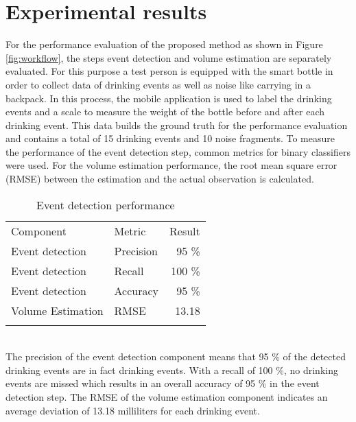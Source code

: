\section{Experimental results}
For the performance evaluation of the proposed method as shown in Figure \ref{fig:workflow}, the steps event detection and volume estimation are separately evaluated. For this purpose a test person is equipped with the smart bottle in order to collect data of drinking events as well as noise like carrying in a backpack. In this process, the mobile application is used to label the drinking events and a scale to measure the weight of the bottle before and after each drinking event. This data builds the ground truth for the performance evaluation and contains a total of 15 drinking events and 10 noise fragments. To measure the performance of the event detection step, common metrics for binary classifiers were used. For the volume estimation performance, the root mean square error (RMSE) between the estimation and the actual observation is calculated.
\begin{table}[h]
    \centering
    \caption{Event detection performance}
    \begin{tabular}{llr}
        \hline\noalign{\smallskip}
        Component & Metric & Result\\
        \tableheadseprule\noalign{\smallskip}
        Event detection & Precision & 95 \% \\
        Event detection & Recall & 100 \% \\
        Event detection & Accuracy & 95 \% \\
        Volume Estimation & RMSE & 13.18 \\
        \noalign{\smallskip}\hline
    \end{tabular}
    \label{tab:performance}
\end{table}\\
The precision of the event detection component means that 95 \% of the detected drinking events are in fact drinking events. With a recall of 100 \%, no drinking events are missed which results in an overall accuracy of 95 \% in the event detection step. The RMSE of the volume estimation component indicates an average deviation of 13.18 milliliters for each drinking event.

